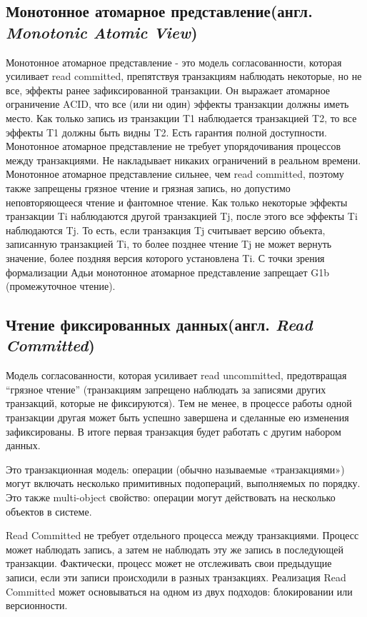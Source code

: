 \documentclass[12pt,  openany]{book}
\begin{document}
\subsection{Монотонное атомарное представление(англ.  \textit{Monotonic Atomic View})}
Монотонное атомарное представление - это модель согласованности, которая усиливает read committed, препятствуя транзакциям наблюдать некоторые, но не все, эффекты ранее зафиксированной транзакции. Он выражает атомарное ограничение ACID, что все (или ни один) эффекты транзакции должны иметь место. Как только запись из транзакции T1 наблюдается транзакцией T2, то все эффекты T1 должны быть видны T2. 
Есть гарантия полной доступности.
Монотонное атомарное представление не требует упорядочивания процессов между транзакциями. Не накладывает никаких ограничений в реальном времени.
Монотонное атомарное представление сильнее, чем  read committed, поэтому также запрещены грязное чтение и грязная запись, но допустимо неповторяющееся чтение и фантомное чтение.
Как только некоторые эффекты транзакции Ti наблюдаются другой транзакцией Tj, после этого все эффекты Ti наблюдаются Tj. То есть, если транзакция Tj считывает версию объекта, записанную транзакцией Ti, то более позднее чтение Tj не может вернуть значение, более поздняя версия которого установлена Ti.
С точки зрения формализации Адьи монотонное атомарное представление запрещает G1b (промежуточное чтение).

\subsection{Чтение фиксированных данных(англ.  \textit{Read Committed})}
Модель согласованности, которая усиливает read uncommitted, предотвращая “грязное чтение” (транзакциям запрещено наблюдать за записями других транзакций, которые не фиксируются). Тем не менее, в процессе работы одной транзакции другая может быть успешно завершена и сделанные ею изменения зафиксированы. В итоге первая транзакция будет работать с другим набором данных.

Это транзакционная модель: операции (обычно называемые «транзакциями») могут включать несколько примитивных подопераций, выполняемых по порядку. Это также multi-object свойство: операции могут действовать на несколько объектов в системе.

Read Committed не требует отдельного процесса между транзакциями. Процесс может наблюдать запись, а затем не наблюдать эту же запись в последующей транзакции. Фактически, процесс может не отслеживать свои предыдущие записи, если эти записи происходили в разных транзакциях.
Реализация Read Committed может основываться на одном из двух подходов: блокировании или версионности.
\end{document}
